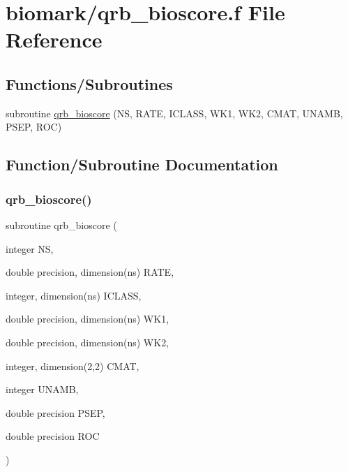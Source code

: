 \hypertarget{qrb__bioscore_8f}{}\section{biomark/qrb\+\_\+bioscore.f File Reference}
\label{qrb__bioscore_8f}
\subsection*{Functions/\+Subroutines}
\begin{DoxyCompactItemize}
\item 
subroutine \hyperlink{qrb__bioscore_8f_a36d442cbfdac00740845c7c08bcb77ae}{qrb\+\_\+bioscore} (NS, R\+A\+TE, I\+C\+L\+A\+SS, W\+K1, W\+K2, C\+M\+AT, U\+N\+A\+MB, P\+S\+EP, R\+OC)
\end{DoxyCompactItemize}


\subsection{Function/\+Subroutine Documentation}
\mbox{\label{qrb__bioscore_8f_a36d442cbfdac00740845c7c08bcb77ae}} 
\subsubsection{\texorpdfstring{qrb\+\_\+bioscore()}{qrb\_bioscore()}}
{\footnotesize\ttfamily subroutine qrb\+\_\+bioscore (\begin{DoxyParamCaption}\item[{integer}]{NS,  }\item[{double precision, dimension(ns)}]{R\+A\+TE,  }\item[{integer, dimension(ns)}]{I\+C\+L\+A\+SS,  }\item[{double precision, dimension(ns)}]{W\+K1,  }\item[{double precision, dimension(ns)}]{W\+K2,  }\item[{integer, dimension(2,2)}]{C\+M\+AT,  }\item[{integer}]{U\+N\+A\+MB,  }\item[{double precision}]{P\+S\+EP,  }\item[{double precision}]{R\+OC }\end{DoxyParamCaption})}

